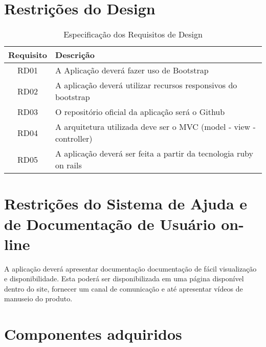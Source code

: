 \begin{apendicesenv}
{\large {\section { Restrições do Design \\ } } }

\begin{table}[H]
                \centering
                \caption{Especificação dos Requisitos de Design}
                \begin{tabular}{c|p{10cm}}
                    \hline
                    \textbf{Requisito} & \textbf{Descrição}\\
                    \hline
                    RD01 & A Aplicação deverá fazer uso de Bootstrap\\ 
                    \hline
                    RD02 & A aplicação deverá utilizar recursos responsivos do bootstrap\\ 
                    \hline
                    RD03 & O repositório oficial da aplicação será o Github\\
                    \hline
                    RD04 & A arquitetura utilizada deve ser o MVC (model - view - controller)\\
                    \hline
                    RD05 &  A aplicação deverá ser feita a  partir da tecnologia ruby on rails\\
                    \hline                    
                \end{tabular}
            \end{table}

{\large {\section { Restrições do Sistema de Ajuda e de Documentação de Usuário on-line \\ } } }

A aplicação deverá apresentar documentação documentação de fácil visualização e disponibilidade. Esta poderá ser disponibilizada em uma página disponível dentro do site, fornecer um canal de comunicação e  até apresentar vídeos de manuseio do produto.\\

{\large {\section { Componentes adquiridos \\ } } }


\end{apendicesenv}
